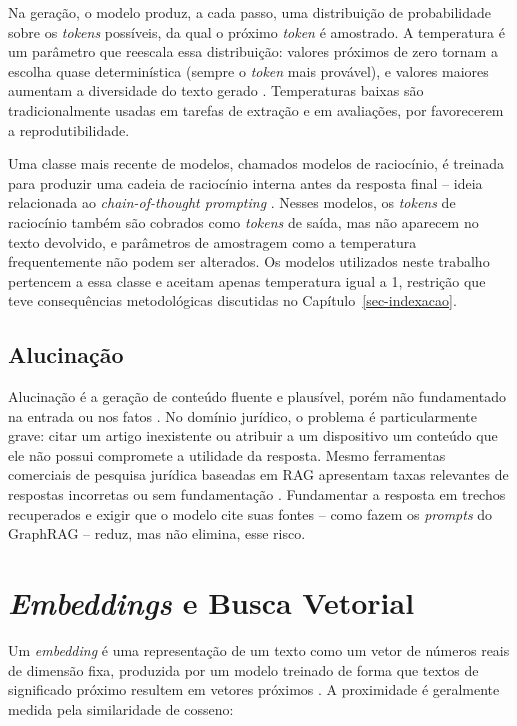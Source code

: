 Na geração, o modelo produz, a cada passo, uma distribuição de probabilidade sobre os \textit{tokens} possíveis, da qual o próximo \textit{token} é amostrado. A temperatura é um parâmetro que reescala essa distribuição: valores próximos de zero tornam a escolha quase determinística (sempre o \textit{token} mais provável), e valores maiores aumentam a diversidade do texto gerado \cite{holtzman2020curious}. Temperaturas baixas são tradicionalmente usadas em tarefas de extração e em avaliações, por favorecerem a reprodutibilidade.

Uma classe mais recente de modelos, chamados modelos de raciocínio, é treinada para produzir uma cadeia de raciocínio interna antes da resposta final -- ideia relacionada ao \textit{chain-of-thought prompting} \cite{wei2022chain}. Nesses modelos, os \textit{tokens} de raciocínio também são cobrados como \textit{tokens} de saída, mas não aparecem no texto devolvido, e parâmetros de amostragem como a temperatura frequentemente não podem ser alterados. Os modelos utilizados neste trabalho pertencem a essa classe e aceitam apenas temperatura igual a 1, restrição que teve consequências metodológicas discutidas no Capítulo~\ref{sec-indexacao}.

\subsection{Alucinação}
\label{sec-referencial-llm-alucinacao}

Alucinação é a geração de conteúdo fluente e plausível, porém não fundamentado na entrada ou nos fatos \cite{ji2023survey}. No domínio jurídico, o problema é particularmente grave: citar um artigo inexistente ou atribuir a um dispositivo um conteúdo que ele não possui compromete a utilidade da resposta. Mesmo ferramentas comerciais de pesquisa jurídica baseadas em RAG apresentam taxas relevantes de respostas incorretas ou sem fundamentação \cite{magesh2024hallucination}. Fundamentar a resposta em trechos recuperados e exigir que o modelo cite suas fontes -- como fazem os \textit{prompts} do GraphRAG -- reduz, mas não elimina, esse risco.

\section{\textit{Embeddings} e Busca Vetorial}
\label{sec-referencial-embeddings}

Um \textit{embedding} é uma representação de um texto como um vetor de números reais de dimensão fixa, produzida por um modelo treinado de forma que textos de significado próximo resultem em vetores próximos \cite{reimers2019sentence}. A proximidade é geralmente medida pela similaridade de cosseno:

